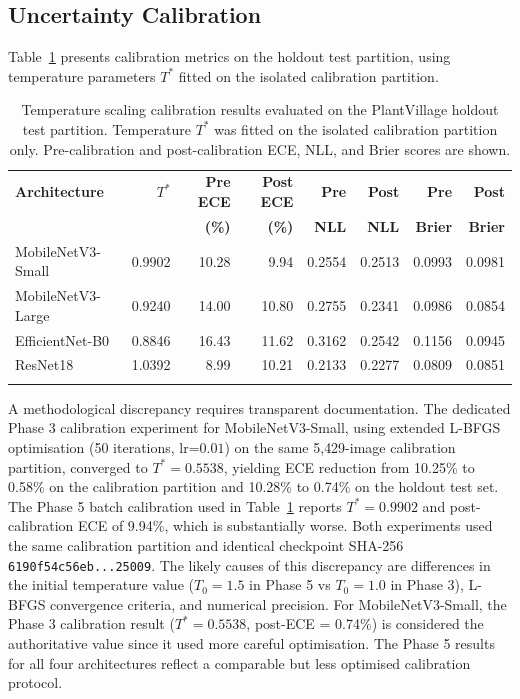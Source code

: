 \documentclass[pdflatex,sn-mathphys-num]{sn-jnl}
\theoremstyle{thmstyleone}%
\theoremstyle{thmstyletwo}%
\theoremstyle{thmstylethree}%
\begin{document}
\subsection{Uncertainty Calibration}
\label{sec:results_calibration}

Table~\ref{tab:calibration_results} presents calibration metrics on the holdout test
partition, using temperature parameters $T^*$ fitted on the isolated calibration
partition.

\begin{table}[h]
\caption{Temperature scaling calibration results evaluated on the PlantVillage holdout
test partition. Temperature $T^*$ was fitted on the isolated calibration partition only.
Pre-calibration and post-calibration ECE, NLL, and Brier scores are shown.}\label{tab:calibration_results}%
\setlength{\tabcolsep}{2.5pt}%
\begin{tabular*}{\textwidth}{@{\extracolsep\fill}lrrrrrrr}
\toprule
\textbf{Architecture} & $T^*$ & \textbf{Pre ECE} & \textbf{Post ECE} & \textbf{Pre} & \textbf{Post} & \textbf{Pre} & \textbf{Post} \\
& & \textbf{(\%)} & \textbf{(\%)} & \textbf{NLL} & \textbf{NLL} & \textbf{Brier} & \textbf{Brier} \\
\midrule
MobileNetV3-Small  & 0.9902 & 10.28 &  9.94 & 0.2554 & 0.2513 & 0.0993 & 0.0981 \\
MobileNetV3-Large  & 0.9240 & 14.00 & 10.80 & 0.2755 & 0.2341 & 0.0986 & 0.0854 \\
EfficientNet-B0    & 0.8846 & 16.43 & 11.62 & 0.3162 & 0.2542 & 0.1156 & 0.0945 \\
ResNet18           & 1.0392 &  8.99 & 10.21 & 0.2133 & 0.2277 & 0.0809 & 0.0851 \\
\botrule
\end{tabular*}
\end{table}

A methodological discrepancy requires transparent documentation. The dedicated Phase 3
calibration experiment for MobileNetV3-Small, using extended L-BFGS optimisation (50
iterations, lr=$0.01$) on the same 5{,}429-image calibration partition, converged to
$T^* = 0.5538$, yielding ECE reduction from 10.25\% to 0.58\% on the calibration
partition and 10.28\% to 0.74\% on the holdout test set. The Phase 5 batch calibration
used in Table~\ref{tab:calibration_results} reports $T^* = 0.9902$ and post-calibration
ECE of 9.94\%, which is substantially worse. Both experiments used the same
calibration partition and identical checkpoint SHA-256
\texttt{6190f54c56eb...25009}. The likely causes of this discrepancy are differences
in the initial temperature value ($T_0 = 1.5$ in Phase 5 vs $T_0 = 1.0$ in Phase 3),
L-BFGS convergence criteria, and numerical precision. For MobileNetV3-Small, the
Phase 3 calibration result ($T^* = 0.5538$, post-ECE = 0.74\%) is considered the
authoritative value since it used more careful optimisation. The Phase 5 results for
all four architectures reflect a comparable but less optimised calibration protocol.
\end{document}
